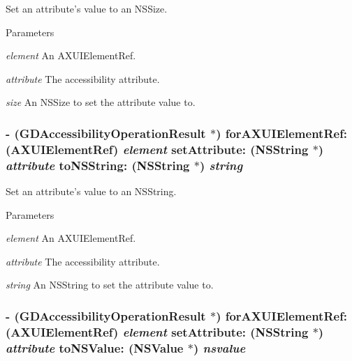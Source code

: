 Set an attribute's value to an NSSize. 
\begin{DoxyParams}{Parameters}
\item[{\em element}]An AXUIElementRef. \item[{\em attribute}]The accessibility attribute. \item[{\em size}]An NSSize to set the attribute value to. \end{DoxyParams}
\hypertarget{interface_g_d_accessibility_manager_a47b117c336fb6627353a74ab78cdd6a1}{
\subsubsection[{forAXUIElementRef:setAttribute:toNSString:}]{\setlength{\rightskip}{0pt plus 5cm}-\/ ({\bf GDAccessibilityOperationResult} $\ast$) forAXUIElementRef: (AXUIElementRef) {\em element}\/ setAttribute: (NSString $\ast$) {\em attribute}\/ toNSString: (NSString $\ast$) {\em string}}}
\label{interface_g_d_accessibility_manager_a47b117c336fb6627353a74ab78cdd6a1}


Set an attribute's value to an NSString. 
\begin{DoxyParams}{Parameters}
\item[{\em element}]An AXUIElementRef. \item[{\em attribute}]The accessibility attribute. \item[{\em string}]An NSString to set the attribute value to. \end{DoxyParams}
\hypertarget{interface_g_d_accessibility_manager_a9a03f4ae6cc68077a661f139293ba9cc}{
\subsubsection[{forAXUIElementRef:setAttribute:toNSValue:}]{\setlength{\rightskip}{0pt plus 5cm}-\/ ({\bf GDAccessibilityOperationResult} $\ast$) forAXUIElementRef: (AXUIElementRef) {\em element}\/ setAttribute: (NSString $\ast$) {\em attribute}\/ toNSValue: (NSValue $\ast$) {\em nsvalue}}}
\label{interface_g_d_accessibility_manager_a9a03f4ae6cc68077a661f139293ba9cc}


